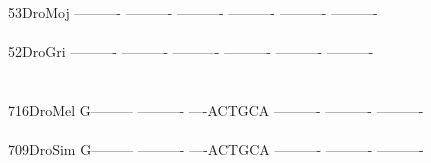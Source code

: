 \documentclass[11pt,twoside,reqno,a4paper]{article}
\begin{document}
{53\hspace*{3\charwidth}DroMoj	----------	----------	----------	----------	----------	----------	\\
\hspace*{5\charwidth}\hspace*{7\charwidth}\hspace*{1\charwidth}\hspace*{1\charwidth}\hspace*{1\charwidth}\hspace*{1\charwidth}\hspace*{1\charwidth}\hspace*{1\charwidth}\\
52\hspace*{3\charwidth}DroGri	----------	----------	----------	----------	----------	----------	\\
\hspace*{5\charwidth}\hspace*{7\charwidth}\hspace*{1\charwidth}\hspace*{1\charwidth}\hspace*{1\charwidth}\hspace*{1\charwidth}\hspace*{1\charwidth}\hspace*{1\charwidth}\\
\\
716\hspace*{2\charwidth}DroMel	G---------	----------	----ACTGCA	----------	----------	----------	\\
\hspace*{5\charwidth}\hspace*{7\charwidth}\hspace*{1\charwidth}\hspace*{1\charwidth}\hspace*{1\charwidth}\hspace*{1\charwidth}\hspace*{1\charwidth}\hspace*{1\charwidth}\\
709\hspace*{2\charwidth}DroSim	G---------	----------	----ACTGCA	----------	----------	----------	\\
\hspace*{5\charwidth}\hspace*{7\charwidth}\hspace*{1\charwidth}\hspace*{1\charwidth}\hspace*{1\charwidth}\hspace*{1\charwidth}\hspace*{1\charwidth}\hspace*{1\charwidth}\\
}
\end{document}

